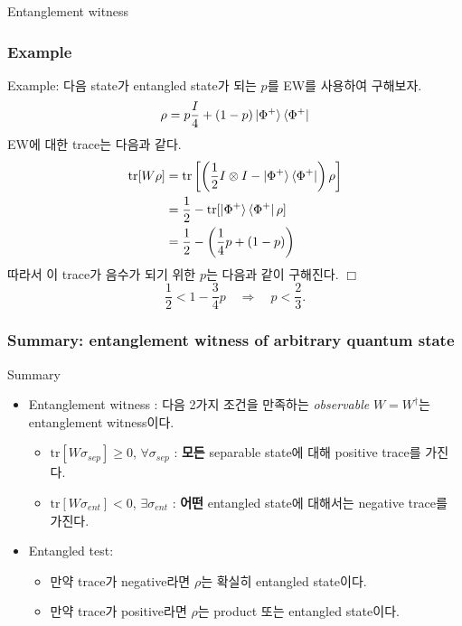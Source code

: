 \documentclass[9pt]{beamer}
\begin{document}
\begin{section}{Entanglement witness}
        \begin{frame}
            \frametitle{Example}
            Example: 다음 state가 entangled state가 되는 $p$를 EW를 사용하여 구해보자.
            \begin{equation*}
                \rho = p \frac{I}{4} + (1-p) \ket{\Phi^+} \bra{\Phi^+}
            \end{equation*}
            EW에 대한 trace는 다음과 같다.
            \begin{align*}
                \text{tr}[W \rho] &= \text{tr}\left[\left(\frac{1}{2} I \otimes I - \ket{\Phi^+}\bra{\Phi^+}\right)\rho\right] \\
                                    &= \frac{1}{2} - \text{tr}[\ket{\Phi^+} \bra{\Phi^+} \rho]\\
                                    &= \frac{1}{2} - \left(\frac{1}{4}p + (1-p)\right)
            \end{align*}
            따라서 이 trace가 음수가 되기 위한 $p$는 다음과 같이 구해진다. $\Box$
            \begin{equation*}
                \frac{1}{2} < 1 -\frac{3}{4}p \quad \Rightarrow \quad p < \frac{2}{3}.
            \end{equation*}
        \end{frame}
    \end{section}

    \begin{frame}
        \frametitle{Summary: entanglement witness of arbitrary quantum state}
        \begin{block}{Summary}
            \begin{itemize}
                \item Entanglement witness :
                다음 2가지 조건을 만족하는 \textit{observable} $W = W^\dagger$는 entanglement witness이다.
                \begin{itemize}
                    \item $\text{tr}[W \sigma_{sep}] \ge 0$, $\forall \sigma_{sep}$ : \textbf{모든} separable state에 대해 positive trace를 가진다.
                    \item $\text{tr}[W \sigma_{ent}] < 0$, $\exists \sigma_{ent}$ : \textbf{어떤} entangled state에 대해서는 negative trace를 가진다.
                \end{itemize}
                \item Entangled test:
                \begin{itemize}
                    \item 만약 trace가 negative라면 $\rho$는 확실히 entangled state이다.
                    \item 만약 trace가 positive라면 $\rho$는 product 또는 entangled state이다.
                \end{itemize}
            \end{itemize}
        \end{block}
    \end{frame}
\end{document}
